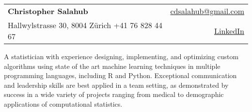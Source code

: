 \documentclass[letterpaper,11pt]{article}
\begin{document}
\begin{tabular*}{\textwidth}{l@{\extracolsep{\fill}}r}
	\textbf{\LARGE{Christopher Salahub}} & \href{mailto:cdsalahub@gmail.com}{cdsalahub@gmail.com} \\
	{Hallwylstrasse 30, 8004 Z\"urich \hspace{0.25cm} +41 76 828 44 67} & \href{https://www.linkedin.com/in/christopher-salahub-9ba79396/}{LinkedIn} \\
\end{tabular*}
\vspace{0.1cm}

A statistician with experience designing, implementing, and optimizing custom algorithms using state of the art machine learning techniques in multiple programming languages, including R and Python. Exceptional communication and leadership skills are best applied in a team setting, as demonstrated by success in a wide variety of projects ranging from medical to demographic applications of computational statistics.
\end{document}
